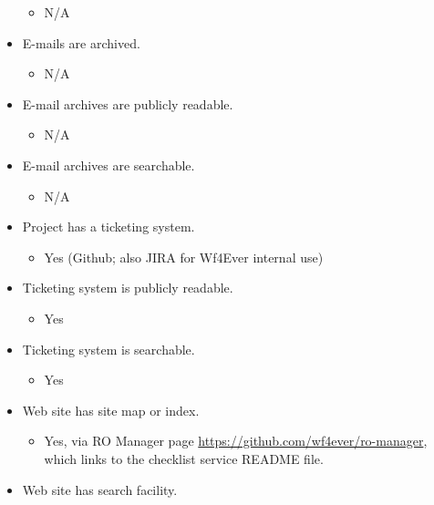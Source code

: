 \begin{itemize}
  \begin{itemize}
  \itemsep1pt\parskip0pt
  \item
    N/A
  \end{itemize}
\item
  E-mails are archived.

  \begin{itemize}
  \itemsep1pt\parskip0pt
  \item
    N/A
  \end{itemize}
\item
  E-mail archives are publicly readable.

  \begin{itemize}
  \itemsep1pt\parskip0pt
  \item
    N/A
  \end{itemize}
\item
  E-mail archives are searchable.

  \begin{itemize}
  \itemsep1pt\parskip0pt
  \item
    N/A
  \end{itemize}
\item
  Project has a ticketing system.

  \begin{itemize}
  \itemsep1pt\parskip0pt
  \item
    Yes (Github; also JIRA for Wf4Ever internal use)
  \end{itemize}
\item
  Ticketing system is publicly readable.

  \begin{itemize}
  \itemsep1pt\parskip0pt
  \item
    Yes
  \end{itemize}
\item
  Ticketing system is searchable.

  \begin{itemize}
  \itemsep1pt\parskip0pt
  \item
    Yes
  \end{itemize}
\item
  Web site has site map or index.

  \begin{itemize}
  \itemsep1pt\parskip0pt
  \item
    Yes, via RO Manager page
    \url{https://github.com/wf4ever/ro-manager}, which links to the
    checklist service README file.
  \end{itemize}
\item
  Web site has search facility.


\end{itemize}
